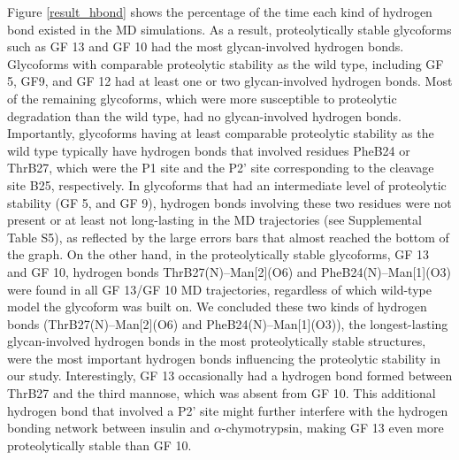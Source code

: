 \documentclass[sn-vancouver]{sn-jnl}
\begin{document}
Figure \ref{result_hbond} shows the percentage of the time each kind of hydrogen bond existed in the MD simulations. As a result, proteolytically stable glycoforms such as GF 13 and GF 10 had the most glycan-involved hydrogen bonds. Glycoforms with comparable proteolytic stability as the wild type, including GF 5, GF9, and GF 12 had at least one or two glycan-involved hydrogen bonds. Most of the remaining glycoforms, which were more susceptible to proteolytic degradation than the wild type, had no glycan-involved hydrogen bonds. Importantly, glycoforms having at least comparable proteolytic stability as the wild type typically have hydrogen bonds that involved residues PheB24 or ThrB27, which were the P1 site and the P2' site corresponding to the cleavage site B25, respectively. In glycoforms that had an intermediate level of proteolytic stability (GF 5, and GF 9), hydrogen bonds involving these two residues were not present or at least not long-lasting in the MD trajectories (see Supplemental Table S5), as reflected by the large errors bars that almost reached the bottom of the graph. On the other hand, in the proteolytically stable glycoforms, GF 13 and GF 10, hydrogen bonds ThrB27(N)--Man[2](O6) and PheB24(N)--Man[1](O3) were found in all GF 13/GF 10 MD trajectories, regardless of which wild-type model the glycoform was built on. We concluded these two kinds of hydrogen bonds (ThrB27(N)--Man[2](O6) and PheB24(N)--Man[1](O3)), the longest-lasting glycan-involved hydrogen bonds in the most proteolytically stable structures, were the most important hydrogen bonds influencing the proteolytic stability in our study. Interestingly, GF 13 occasionally had a hydrogen bond formed between ThrB27 and the third mannose, which was absent from GF 10. This additional hydrogen bond that involved a P2' site might further interfere with the hydrogen bonding network between insulin and $\alpha$-chymotrypsin, making GF 13 even more proteolytically stable than GF 10. 
\end{document}
